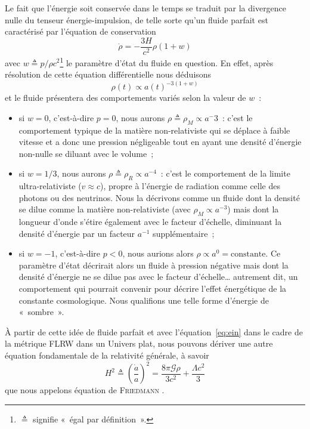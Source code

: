 \documentclass[../main/main.tex]{subfiles}
\begin{document}
Le fait que l'énergie soit conservée dans le temps se traduit par la divergence
nulle du tenseur énergie-impulsion, de telle sorte qu'un fluide parfait est
caractérisé par l'équation de conservation
\begin{equation}\label{eq:cons}
    \dot{\rho} = -\frac{3H}{c^2}\rho(1+w)
\end{equation}
avec $w \triangleq p/\rho c^2$\footnote{$\triangleq$ signifie «~égal par
définition~».} le paramètre d'état du fluide en question. En effet, après
résolution de cette équation différentielle nous déduisons
\begin{equation}\label{eq:rho}
    \rho(t) \propto a(t)^{-3(1+w)}
\end{equation}
et le fluide présentera des comportements variés selon la valeur de $w$~:
\begin{itemize}
    \item si $w=0$, c'est-à-dire $p=0$, nous aurons $\rho \triangleq \rho_M
        \propto a^-3$~: c'est le comportement typique de la matière
        non-relativiste
        qui se déplace à faible vitesse et a donc une pression négligeable tout
        en ayant une densité d'énergie non-nulle se diluant avec le volume~;

    \item si $w=1/3$, nous aurons $\rho \triangleq \rho_R \propto a^{-4}$~:
        c'est le comportement de la limite ultra-relativiste ($v \approx c$),
        propre à l'énergie de radiation comme celle des photons ou des
        neutrinos. Nous la décrivons comme un fluide dont la densité se dilue
        comme la matière non-relativiste (avec $\rho_M \propto a^{-3}$) mais
        dont la longueur d'onde s'étire également avec le facteur d'échelle,
        diminuant la densité d'énergie par un facteur $a^{-1}$ supplémentaire~;

    \item si $w=-1$, c'est-à-dire $p < 0$, nous aurions alors $\rho \propto a^0
        = \text{constante}$. Ce paramètre d'état décrirait alors un fluide à
        pression négative mais dont la densité d'énergie ne se dilue pas avec le
        facteur d'échelle… autrement dit, un comportement qui pourrait convenir
        pour décrire l'effet énergétique de la constante cosmologique. Nous
        qualifions une telle forme d'énergie de «~sombre~».
\end{itemize}

À partir de cette idée de fluide parfait et avec l'équation~\ref{eq:ein} dans le
cadre de la métrique FLRW dans un Univers plat, nous pouvons dériver une autre
équation fondamentale de la relativité générale, à savoir
\begin{equation}\label{eq:fried}
    H^2 \triangleq \left( \frac{\dot{a}}{a} \right)^2 =
    \frac{8\pi\mathcal{G}\rho}{3c^2} + \frac{\Lambda c^2}{3}
\end{equation}
que nous appelons équation de \textsc{Friedmann} \citep{friedmann1922}.
\end{document}
